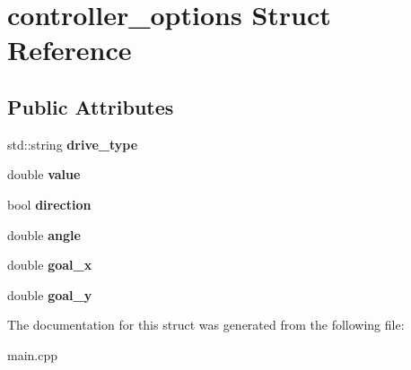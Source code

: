 \hypertarget{structcontroller__options}{}\section{controller\+\_\+options Struct Reference}
\label{structcontroller__options}
\subsection*{Public Attributes}
\begin{DoxyCompactItemize}
\item 
\mbox{\label{structcontroller__options_ae2663ae023b5dafd635b4d68bee45ca8}} 
std\+::string {\bfseries drive\+\_\+type}
\item 
\mbox{\label{structcontroller__options_ab243c535f12c0e85a3e960699d0ccf3e}} 
double {\bfseries value}
\item 
\mbox{\label{structcontroller__options_a6baf880b53ab4d8af6df12a07f5d60a3}} 
bool {\bfseries direction}
\item 
\mbox{\label{structcontroller__options_a07912eff264bc20bf0fa5f89fcc3d954}} 
double {\bfseries angle}
\item 
\mbox{\label{structcontroller__options_aa9b9c70f468bb33fd68b2f69bb133e73}} 
double {\bfseries goal\+\_\+x}
\item 
\mbox{\label{structcontroller__options_a8dd5f92481c80a914747656533915b13}} 
double {\bfseries goal\+\_\+y}
\end{DoxyCompactItemize}


The documentation for this struct was generated from the following file\+:\begin{DoxyCompactItemize}
\item 
main.\+cpp\end{DoxyCompactItemize}
